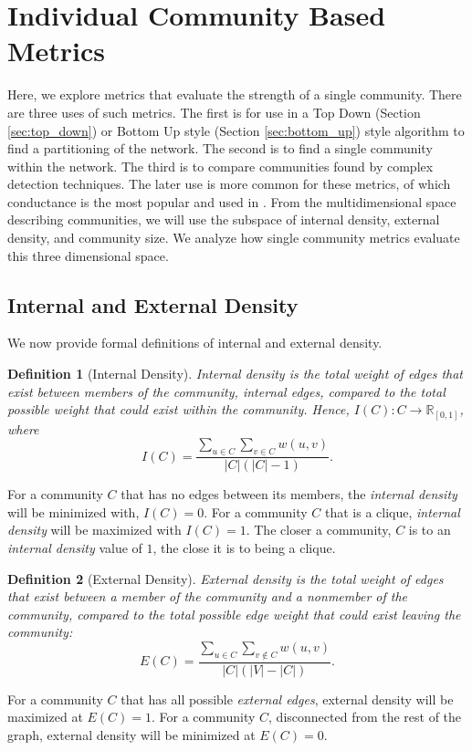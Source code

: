 \documentclass[phd,tocprelim]{cornell}
\newtheorem{definition}{Definition}
\begin{document}
\section{Individual Community Based Metrics}

Here, we explore metrics that evaluate the strength of a single community.  There are three uses of such metrics.  The first is for use in a Top Down (Section \ref{sec:top_down}) or Bottom Up style (Section \ref{sec:bottom_up}) style algorithm to find a partitioning of the network.  The second is to find a single community within the network.  The third is to compare communities found by complex detection techniques.  The later use is more common for these metrics, of which conductance is the most popular and used in \cite{JTODO}.  From the multidimensional space describing communities, we will use the subspace of internal density, external density, and community size.  We analyze how single community metrics evaluate this three dimensional space.


\subsection{Internal and External Density}

We now provide formal definitions of internal and external density.
\begin{definition}[Internal Density]
\label{def:int_density_single}
Internal density is the total weight of edges that exist between members of the community, {\it internal edges}, compared to the total possible weight that could exist within the community.  Hence, $I(C) : C \rightarrow \mathbb{R}_{[0, 1]}$, where
\begin{equation}
 I(C) =\frac{\sum_{u \in C} \sum_{v \in C} w(u,v)}{|C|(|C| - 1)} .
\end{equation}
\label{def_int_density}
\end{definition}
For a community $C$ that has no edges between its members, the {\it internal density} will be minimized with, $I(C) = 0$.  For a community $C$ that is a clique, {\it internal density} will be maximized with $I(C) = 1$.  The closer a community, $C$ is to an {\it internal density} value of $1$, the close it is to being a clique.  
\begin{definition}[External Density]
\label{def:ext_density_single}
External density is the total weight of edges that exist between a member of the community and a nonmember of the community, compared to the total possible edge weight that could exist leaving the community:
\begin{equation}
 E(C) = \frac{\sum_{u \in C} \sum_{v \notin C} w(u,v)}{|C|(|V| - |C|)}.
\end{equation}
\label{def_ext_density}
\end{definition}
For a community $C$ that has all possible {\it external edges}, external density will be maximized at $E(C)=1$.  For a community $C$, disconnected from the rest of the graph, external density will be minimized at $E(C) = 0$.
\end{document}
